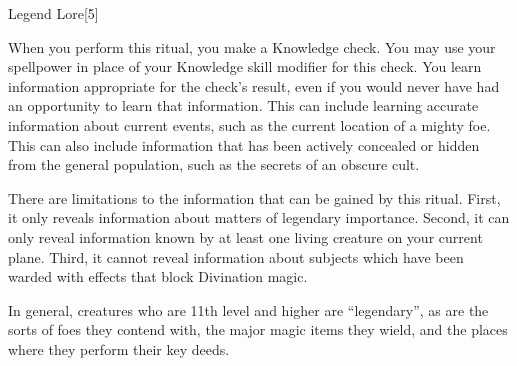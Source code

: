 \begin{spellsection}{Legend Lore}[5]
    \begin{spellheader}
    \end{spellheader}
    \begin{spellcontent}
        \begin{spelltargetinginfo}
        \end{spelltargetinginfo}
        \begin{spelleffects}
            \spelleffect When you perform this ritual, you make a Knowledge check.
            You may use your spellpower in place of your Knowledge skill modifier for this check.
            You learn information appropriate for the check's result, even if you would never have had an opportunity to learn that information.
            This can include learning accurate information about current events, such as the current location of a mighty foe.
            This can also include information that has been actively concealed or hidden from the general population, such as the secrets of an obscure cult.

            There are limitations to the information that can be gained by this ritual.
            First, it only reveals information about matters of legendary importance.
            Second, it can only reveal information known by at least one living creature on your current plane.
            Third, it cannot reveal information about subjects which have been warded with effects that block Divination magic.
        \end{spelleffects}
    \end{spellcontent}
    \begin{spellfooter}
        \spellnotes In general, creatures who are 11th level and higher are ``legendary'', as are the sorts of foes they contend with, the major magic items they wield, and the places where they perform their key deeds.
    \end{spellfooter}
\end{spellsection}

